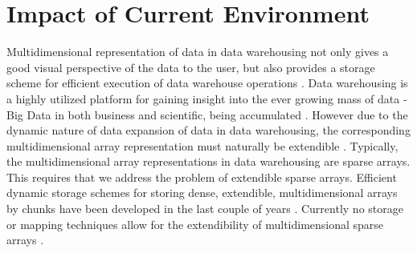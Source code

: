 \section{Impact of Current Environment}
Multidimensional representation of data in data warehousing not only gives a good visual perspective of the data to the user, but also provides a storage scheme for efficient execution of data warehouse operations \cite{nimako:2012:ced}. Data warehousing is a highly utilized platform for gaining insight into the ever growing mass of data - Big Data in both business and scientific, being accumulated \cite{goil:bess}. However due to the dynamic nature of data expansion of data in data warehousing, the corresponding multidimensional array representation must naturally be extendible \cite{nimako:2012:ced} \cite{pedereira:2015:cas}. Typically, the multidimensional array representations in data warehousing are sparse arrays. This requires that we address the problem of extendible sparse arrays. Efficient dynamic storage schemes for storing dense, extendible, multidimensional arrays by chunks have been developed in the last couple of years \cite{nimako:2012:ced} \cite{pedereira:2015:cas}. Currently no storage or mapping techniques allow for the extendibility of multidimensional sparse arrays \cite{nimako:2016:cea}.

